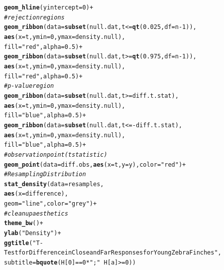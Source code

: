 \documentclass{article}\usepackage[]{graphicx}\usepackage[]{xcolor}
\makeatletter
\newcommand{\hlnum}[1]{\textcolor[rgb]{0.686,0.059,0.569}{#1}}%
\newcommand{\hlsng}[1]{\textcolor[rgb]{0.192,0.494,0.8}{#1}}%
\newcommand{\hlcom}[1]{\textcolor[rgb]{0.678,0.584,0.686}{\textit{#1}}}%
\newcommand{\hlopt}[1]{\textcolor[rgb]{0,0,0}{#1}}%
\newcommand{\hldef}[1]{\textcolor[rgb]{0.345,0.345,0.345}{#1}}%
\newcommand{\hlkwc}[1]{\textcolor[rgb]{0.333,0.667,0.333}{#1}}%
\newcommand{\hlkwd}[1]{\textcolor[rgb]{0.737,0.353,0.396}{\textbf{#1}}}%
\newenvironment{kframe}{%
 \def\at@end@of@kframe{}%
 \ifinner\ifhmode%
  \def\at@end@of@kframe{\end{minipage}}%
  \begin{minipage}{\columnwidth}%
 \fi\fi%
 \def\FrameCommand##1{\hskip\@totalleftmargin \hskip-\fboxsep
 \colorbox{shadecolor}{##1}\hskip-\fboxsep
     \hskip-\linewidth \hskip-\@totalleftmargin \hskip\columnwidth}%
 \MakeFramed {\advance\hsize-\width
   \@totalleftmargin\z@ \linewidth\hsize
   \@setminipage}}%
 {\par\unskip\endMakeFramed%
 \at@end@of@kframe}
\newenvironment{knitrout}{}{} %
\makeatother
\begin{document}
\begin{enumerate}
\begin{enumerate}
\begin{knitrout}
\begin{kframe}
\begin{alltt}
  \hlkwd{geom_hline}\hldef{(}\hlkwc{yintercept}\hldef{=}\hlnum{0}\hldef{)}\hlopt{+}
  \hlcom{# rejection regions}
  \hlkwd{geom_ribbon}\hldef{(}\hlkwc{data}\hldef{=}\hlkwd{subset}\hldef{(null.dat, t}\hlopt{<=}\hlkwd{qt}\hldef{(}\hlnum{0.025}\hldef{,} \hlkwc{df}\hldef{=n}\hlopt{-}\hlnum{1}\hldef{)),}
              \hlkwd{aes}\hldef{(}\hlkwc{x}\hldef{=t,} \hlkwc{ymin}\hldef{=}\hlnum{0}\hldef{,} \hlkwc{ymax}\hldef{=density.null),}
              \hlkwc{fill}\hldef{=}\hlsng{"red"}\hldef{,} \hlkwc{alpha}\hldef{=}\hlnum{0.5}\hldef{)} \hlopt{+}
  \hlkwd{geom_ribbon}\hldef{(}\hlkwc{data}\hldef{=}\hlkwd{subset}\hldef{(null.dat, t}\hlopt{>=}\hlkwd{qt}\hldef{(}\hlnum{0.975}\hldef{,} \hlkwc{df}\hldef{=n}\hlopt{-}\hlnum{1}\hldef{)),}
              \hlkwd{aes}\hldef{(}\hlkwc{x}\hldef{=t,} \hlkwc{ymin}\hldef{=}\hlnum{0}\hldef{,} \hlkwc{ymax}\hldef{=density.null),}
              \hlkwc{fill}\hldef{=}\hlsng{"red"}\hldef{,} \hlkwc{alpha}\hldef{=}\hlnum{0.5}\hldef{)} \hlopt{+}
  \hlcom{#p-value region}
  \hlkwd{geom_ribbon}\hldef{(}\hlkwc{data}\hldef{=}\hlkwd{subset}\hldef{(null.dat, t}\hlopt{>=}\hldef{diff.t.stat),}
              \hlkwd{aes}\hldef{(}\hlkwc{x}\hldef{=t,} \hlkwc{ymin}\hldef{=}\hlnum{0}\hldef{,} \hlkwc{ymax}\hldef{=density.null),}
              \hlkwc{fill}\hldef{=}\hlsng{"blue"}\hldef{,} \hlkwc{alpha}\hldef{=}\hlnum{0.5}\hldef{)} \hlopt{+}
  \hlkwd{geom_ribbon}\hldef{(}\hlkwc{data}\hldef{=}\hlkwd{subset}\hldef{(null.dat, t}\hlopt{<=-}\hldef{diff.t.stat),}
              \hlkwd{aes}\hldef{(}\hlkwc{x}\hldef{=t,} \hlkwc{ymin}\hldef{=}\hlnum{0}\hldef{,} \hlkwc{ymax}\hldef{=density.null),}
              \hlkwc{fill}\hldef{=}\hlsng{"blue"}\hldef{,} \hlkwc{alpha}\hldef{=}\hlnum{0.5}\hldef{)} \hlopt{+}
  \hlcom{#observation point (t statistic)}
  \hlkwd{geom_point}\hldef{(}\hlkwc{data}\hldef{=diff.obs,} \hlkwd{aes}\hldef{(}\hlkwc{x}\hldef{=t,} \hlkwc{y}\hldef{=y),} \hlkwc{color}\hldef{=}\hlsng{"red"}\hldef{)}\hlopt{+}
  \hlcom{#Resampling Distribution}
  \hlkwd{stat_density}\hldef{(}\hlkwc{data}\hldef{=resamples,}
               \hlkwd{aes}\hldef{(}\hlkwc{x}\hldef{=difference),}
               \hlkwc{geom}\hldef{=}\hlsng{"line"}\hldef{,} \hlkwc{color}\hldef{=}\hlsng{"grey"}\hldef{)}\hlopt{+}
  \hlcom{#clean up aesthetics}
  \hlkwd{theme_bw}\hldef{()}\hlopt{+}
  \hlkwd{ylab}\hldef{(}\hlsng{"Density"}\hldef{)}\hlopt{+}
  \hlkwd{ggtitle}\hldef{(}\hlsng{"T-Test for Difference in Close and Far Responses for Young Zebra Finches"}\hldef{,}
          \hlkwc{subtitle}\hldef{=}\hlkwd{bquote}\hldef{(H[}\hlnum{0}\hldef{]}\hlopt{==}\hlnum{0}\hlopt{*}\hlsng{";"}\hlopt{~}\hldef{H[a]}\hlopt{>=}\hlnum{0}\hldef{))}

\end{alltt}
\end{kframe}
\end{knitrout}
\end{enumerate}
\end{enumerate}
\end{document}

